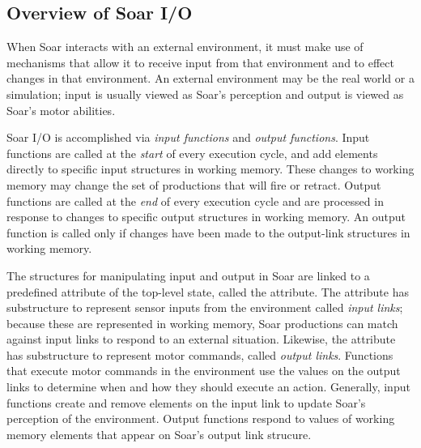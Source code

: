 \subsection{Overview of Soar I/O}

When Soar interacts with an external environment, it must make use of
mechanisms that allow it to receive input from that environment and to effect
changes in that environment. An external environment may be the real world or
a simulation; input is usually viewed as Soar's perception and output is
viewed as Soar's motor abilities.


Soar I/O is accomplished via \emph{input functions} and
\emph{output functions}. Input functions are called at the 
\emph{start}
of every execution cycle, and add elements directly to specific input
structures in working memory.  These changes to working memory
may change the set of productions that will fire or retract. 
Output functions are called
at the \emph{end} of every execution cycle and are processed in response to
changes to specific output structures in working memory.  An output function
is called only if changes have been made to the output-link structures in
working memory.

The structures for manipulating input and output in Soar are linked
to a predefined attribute of the
top-level state, called the  attribute.  The  attribute has
substructure to represent sensor inputs from the environment called
\emph{input links}; because these are represented in working memory, Soar
productions can match against input links to respond to an external
situation. Likewise, the  attribute has substructure to
represent motor commands, called \emph{output links}. Functions that 
execute motor commands in the environment use the values on the output links 
to determine when and how they should execute an action.  Generally,
input functions create and remove elements on the input link to update
Soar's perception of the environment.  Output functions respond to values
of working memory elements that appear on Soar's output link strucure.



